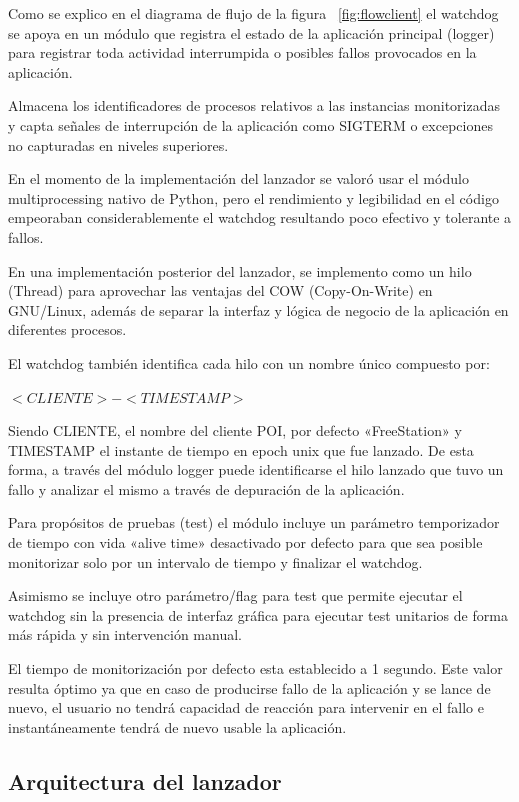 Como se explico en el diagrama de flujo de la figura ~\ref{fig:flowclient} el
watchdog se apoya en un módulo que registra el estado de la aplicación 
principal (logger) para registrar toda actividad interrumpida o posibles 
fallos provocados en la aplicación.

Almacena los identificadores de procesos relativos a las instancias monitorizadas y capta señales
de interrupción de la aplicación como SIGTERM o excepciones no capturadas en niveles superiores.

En el momento de la implementación del lanzador se valoró usar el módulo 
multiprocessing nativo de Python, pero el
rendimiento y legibilidad en el código empeoraban considerablemente el 
watchdog resultando poco
efectivo y tolerante a fallos.

En una implementación posterior del lanzador, se implemento como un hilo 
(Thread) para aprovechar las ventajas
del COW (Copy-On-Write) en GNU/Linux, además de separar la interfaz y 
lógica de negocio de la aplicación
en diferentes procesos.

El watchdog también identifica cada hilo con un nombre único compuesto por:

$<CLIENTE>-<TIMESTAMP>$

Siendo CLIENTE, el nombre del cliente POI, por defecto «FreeStation» y 
TIMESTAMP el instante de tiempo en epoch
unix que fue lanzado. De esta forma, a través del módulo logger puede 
identificarse el hilo lanzado que tuvo
un fallo y analizar el mismo a través de depuración de la aplicación.

Para propósitos de pruebas (test) el módulo incluye un parámetro temporizador 
de tiempo con vida «alive time» desactivado
por defecto para que sea posible monitorizar solo por un intervalo de tiempo 
y finalizar el watchdog.

Asimismo se incluye otro parámetro/flag para test que permite ejecutar el 
watchdog sin la presencia de interfaz gráfica
para ejecutar test unitarios de forma más rápida y sin intervención manual.

\newpage

El tiempo de monitorización por defecto esta establecido a 1 segundo. Este 
valor resulta óptimo ya que en caso de
producirse fallo de la aplicación y se lance de nuevo, el usuario no tendrá 
capacidad de reacción para intervenir en el fallo
e instantáneamente tendrá de nuevo usable la aplicación.

\subsection{Arquitectura del lanzador}

